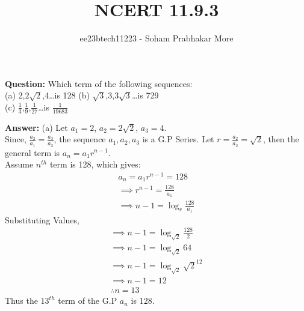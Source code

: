 \documentclass[journal,12pt,twocolumn]{IEEEtran}
\theoremstyle{remark}
\begin{document}

\vspace{3cm}

\title{NCERT 11.9.3}
\author{ee23btech11223 - Soham Prabhakar More%
}
\maketitle
\newpage
\bigskip

\renewcommand{\thefigure}{\theenumi}
\renewcommand{\thetable}{\theenumi}



\textbf{Question:}
Which term of the following sequences:\\
(a) 2,$2\sqrt{2}$,4\dots is 128
\quad(b) $\sqrt{3}$,3,$3\sqrt{3}$\dots is 729\\
(c) $\frac{1}{3}$,$\frac{1}{9}$,$\frac{1}{27}$\dots is $\frac{1}{19683}$

\textbf{Answer:} (a) Let $a_1 = 2$, $a_2 = 2\sqrt{2}$, $a_3 = 4$.\\
Since, $\frac{a_2}{a_1} = \frac{a_3}{a_2}$, the sequence $a_1, a_2, a_3$ is a G.P Series.
Let $r = \frac{a_2}{a_2} = \sqrt{2}$, then the general term is $a_n = a_1 r^{n-1}$.\\
Assume $n^{th}$ term is 128, which gives: 
\begin{gather*}
    a_n = a_1 r^{n-1} = 128\\
    \implies r^{n-1} = \frac{128}{a_1}\\
    \implies n - 1 = \log_{r}{\frac{128}{a_1}}
\end{gather*}
Substituting Values,
\begin{gather*}
    \implies n - 1 = \log_{\sqrt{2}}{\frac{128}{2}}\\
    \implies n - 1 = \log_{\sqrt{2}}{64}\\
    \implies n - 1 = \log_{\sqrt{2}}{\sqrt{2}^{12}}\\
    \implies n - 1 = 12\\
    \therefore n = 13
\end{gather*}
Thus the $13^{th}$ term of the G.P $a_n$ is 128.\\
\end{document}

